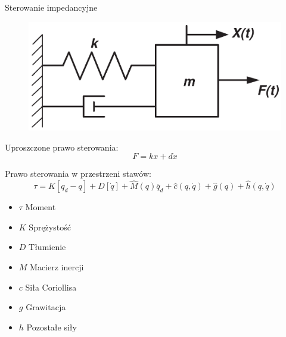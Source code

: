 \documentclass{beamer}
\begin{document}
	\begin{frame}[allowframebreaks]{Sterowanie impedancyjne}
		\begin{figure}[h]
			\centering
			\includegraphics[scale=1.30]{mds}
		\end{figure}

Uproszczone prawo sterowania:
	\begin{equation}
	F = kx + d\dot{x}
	\end{equation}

Prawo sterowania w przestrzeni stawów:
	\begin{equation}
	\tau = K[q_d-q] + D[\dot{q}] + \hat{M}(q)\ddot{q_d} + \hat{c}(q, \dot{q}) + \hat{g}(q) + \hat{h}(q, \dot{q})
	\end{equation}

\begin{itemize}
	\item $\tau$ Moment
	\item $K$ Sprężystość
	\item $D$ Tłumienie
	\item $M$ Macierz inercji
	\item $c$ Siła Coriollisa
	\item $g$ Grawitacja
	\item $h$ Pozostałe siły
\end{itemize}
\end{frame}
\end{document}
